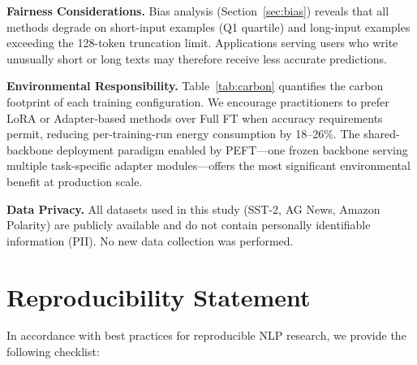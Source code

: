 \documentclass[conference]{IEEEtran}
\begin{document}
\textbf{Fairness Considerations.} Bias analysis (Section~\ref{sec:bias}) reveals that all methods degrade on short-input examples (Q1 quartile) and long-input examples exceeding the 128-token truncation limit. Applications serving users who write unusually short or long texts may therefore receive less accurate predictions.

\textbf{Environmental Responsibility.} Table~\ref{tab:carbon} quantifies the carbon footprint of each training configuration. We encourage practitioners to prefer LoRA or Adapter-based methods over Full FT when accuracy requirements permit, reducing per-training-run energy consumption by 18--26\%. The shared-backbone deployment paradigm enabled by PEFT---one frozen backbone serving multiple task-specific adapter modules---offers the most significant environmental benefit at production scale.

\textbf{Data Privacy.} All datasets used in this study (SST-2, AG News, Amazon Polarity) are publicly available and do not contain personally identifiable information (PII). No new data collection was performed.

\section{Reproducibility Statement}
\label{sec:reproducibility}

In accordance with best practices for reproducible NLP research, we provide the following checklist:
\end{document}
